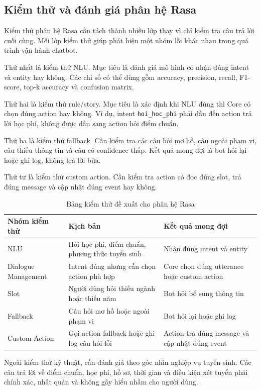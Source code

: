 \subsection{Kiểm thử và đánh giá phân hệ Rasa}

Kiểm thử phân hệ Rasa cần tách thành nhiều lớp thay vì chỉ kiểm tra câu trả lời cuối cùng. Mỗi lớp kiểm thử giúp phát hiện một nhóm lỗi khác nhau trong quá trình vận hành chatbot.

Thứ nhất là kiểm thử NLU. Mục tiêu là đánh giá mô hình có nhận đúng intent và entity hay không. Các chỉ số có thể dùng gồm accuracy, precision, recall, F1-score, top-k accuracy và confusion matrix.

Thứ hai là kiểm thử rule/story. Mục tiêu là xác định khi NLU đúng thì Core có chọn đúng action hay không. Ví dụ, intent \texttt{hoi\_hoc\_phi} phải dẫn đến action trả lời học phí, không được dẫn sang action hỏi điểm chuẩn.

Thứ ba là kiểm thử fallback. Cần kiểm tra các câu hỏi mơ hồ, câu ngoài phạm vi, câu thiếu thông tin và câu có confidence thấp. Kết quả mong đợi là bot hỏi lại hoặc ghi log, không trả lời bừa.

Thứ tư là kiểm thử custom action. Cần kiểm tra action có đọc đúng slot, trả đúng message và cập nhật đúng event hay không.

\begin{table}[H]
\centering
\begin{tabular}{|p{3.5cm}|p{4.5cm}|p{5cm}|}
\hline
\textbf{Nhóm kiểm thử} & \textbf{Kịch bản} & \textbf{Kết quả mong đợi} \\
\hline
NLU & Hỏi học phí, điểm chuẩn, phương thức tuyển sinh & Nhận đúng intent và entity \\
\hline
Dialogue Management & Intent đúng nhưng cần chọn action phù hợp & Core chọn đúng utterance hoặc custom action \\
\hline
Slot & Người dùng hỏi thiếu ngành hoặc thiếu năm & Bot hỏi bổ sung thông tin \\
\hline
Fallback & Câu hỏi mơ hồ hoặc ngoài phạm vi & Bot hỏi lại hoặc ghi log \\
\hline
Custom Action & Gọi action fallback hoặc ghi log câu hỏi lỗi & Action trả đúng message và cập nhật đúng event \\
\hline
\end{tabular}
\caption{Bảng kiểm thử đề xuất cho phân hệ Rasa}
\label{tab:rasa-testing-plan}
\end{table}

Ngoài kiểm thử kỹ thuật, cần đánh giá theo góc nhìn nghiệp vụ tuyển sinh. Các câu trả lời về điểm chuẩn, học phí, hồ sơ, thời gian và điều kiện xét tuyển phải chính xác, nhất quán và không gây hiểu nhầm cho người dùng.

